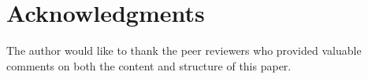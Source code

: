 \documentclass[runningheads,a4paper]{llncs}
\begin{document}
\section{Acknowledgments}
The author would like to thank the peer reviewers who provided valuable comments on both the content and structure of this paper.

%
% 
%
%

%


\end{document}
